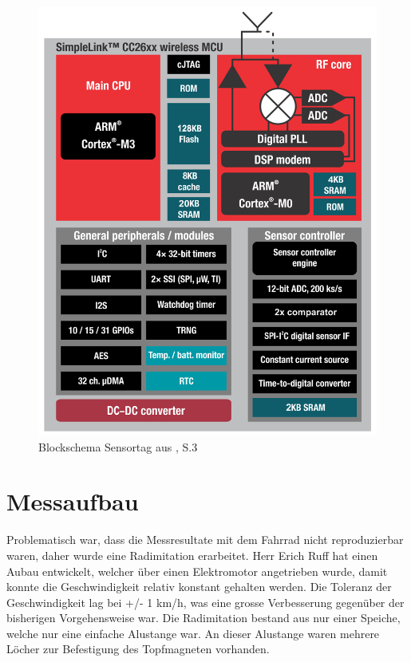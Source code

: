 \begin{figure}[h]
    \includegraphics {7Anhang/imag/CC26xx_Block_Diagram.png} 
     \caption{Blockschema Sensortag aus \cite{Sensortag_Datasheet}, S.3}
\end{figure}



\chapter{Messaufbau}
\label{messaufbau}
Problematisch war, dass die Messresultate mit dem Fahrrad nicht reproduzierbar waren, daher wurde eine Radimitation erarbeitet. Herr Erich Ruff hat einen Aubau entwickelt, welcher über einen Elektromotor angetrieben wurde, damit konnte die Geschwindigkeit relativ konstant gehalten werden. Die Toleranz der Geschwindigkeit lag bei +/- 1 km/h, was eine grosse Verbesserung gegenüber der bisherigen Vorgehensweise war.
Die Radimitation bestand aus nur einer Speiche, welche nur eine einfache Alustange war. An dieser Alustange waren mehrere Löcher zur Befestigung des Topfmagneten vorhanden.


